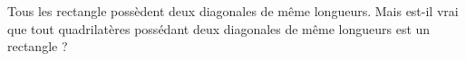 
\begin{exercice}\label{exosmath-0783}

    Tous les rectangle possèdent deux diagonales de même longueurs. Mais est-il vrai que tout quadrilatères possédant deux diagonales de même longueurs est un rectangle ?

\end{exercice}
